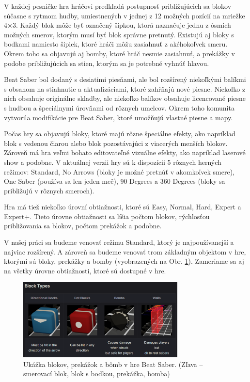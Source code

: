 V každej pesničke hra hráčovi predkladá postupnosť približujúcich sa blokov súčasne s rytmom hudby, umiestnených v jednej z 12 možných pozícií na mriežke 4×3. Každý blok môže byť označený šípkou, ktorá naznačuje jednu z ôsmich možných smerov, ktorým musí byť blok správne pretnutý. Existujú aj bloky s bodkami namiesto šipiek, ktoré hráči môžu zasiahnuť z akéhokoľvek smeru. Okrem toho sa objavujú aj bomby, ktoré hráč nesmie zasiahnuť, a prekážky v podobe približujúcich sa stien, ktorým sa je potrebné vyhnúť hlavou.

Beat Saber bol dodaný s desiatimi piesňami, ale bol rozšírený niekoľkými balíkmi s obsahom na stiahnutie a aktualizáciami, ktoré zahŕňajú nové piesne. Niekoľko z nich obsahuje originálne skladby, ale niekoľko balíkov obsahuje licencované piesne s hudbou a špeciálnymi úrovňami od rôznych umelcov. Okrem toho komunita vytvorila modifikácie pre Beat Saber, ktoré umožňujú vlastné piesne a mapy.

Počas hry sa objavujú bloky, ktoré majú rôzne špeciálne efekty, ako napríklad blok s vedenou čiarou alebo blok pozostávajúci z viacerých menších blokov. Zároveň má hra veľmi bohato editovateľné vizuálne efekty, ako napríklad laserové show a podobne. V aktuálnej verzii hry sú k dispozícii 5 rôznych herných režimov: Standard, No Arrows (bloky je možné pretnúť v akomkoľvek smere), One Saber (používa sa len jeden meč), 90 Degrees a 360 Degrees (bloky sa približujú v rôznych smeroch).

Hra má tiež niekoľko úrovní obtiažnosti, ktoré sú Easy, Normal, Hard, Expert a Expert+. Tieto úrovne obtiažnosti sa líšia počtom blokov, rýchlosťou približovania sa blokov, počtom prekážok a podobne.

V našej práci sa budeme venovať režimu Standard, ktorý je najpoužívanejší a najviac rozšírený. A zároveň sa budeme venovať trom základným objektom v hre, ktorými sú bloky, prekážky a bomby (vyobrazených na Obr. \ref{fig:blocks}). Zameriame sa aj na všetky úrovne obtiažnosti, ktoré sú dostupné v hre.

\begin{figure}[H]
  \centerline{\includegraphics[width=0.75\textwidth]{images/block types.png}}
  \caption{Ukážka blokov, prekážok a bômb v hre Beat Saber. (Zľava – smerovací blok, blok s bodkou, prekážka, bomba)}
  \label{fig:blocks}
  \end{figure}

